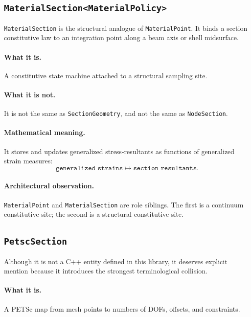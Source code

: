 \subsection{\texttt{MaterialSection<MaterialPolicy>}}

\texttt{MaterialSection} is the structural analogue of \texttt{MaterialPoint}.
It binds a section constitutive law to an integration point along a beam axis
or shell midsurface.

\paragraph{What it is.}
A constitutive state machine attached to a structural sampling site.

\paragraph{What it is not.}
It is not the same as \texttt{SectionGeometry}, and not the same as
\texttt{NodeSection}.

\paragraph{Mathematical meaning.}
It stores and updates generalized stress-resultants as functions of generalized
strain measures:
\[
\texttt{generalized strains} \mapsto \texttt{section resultants}.
\]

\paragraph{Architectural observation.}
\texttt{MaterialPoint} and \texttt{MaterialSection} are role siblings.  The
first is a continuum constitutive site; the second is a structural
constitutive site.


\subsection{\texttt{PetscSection}}

Although it is not a C++ entity defined in this library, it deserves explicit
mention because it introduces the strongest terminological collision.

\paragraph{What it is.}
A PETSc map from mesh points to numbers of DOFs, offsets, and constraints.

